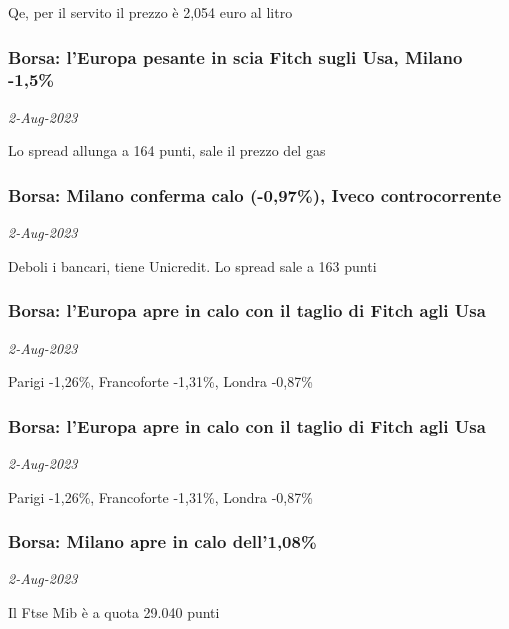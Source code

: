 Qe, per il servito il prezzo \`{e} 2,054 euro al litro
\subsubsection{Borsa: l'Europa pesante in scia Fitch sugli Usa, Milano -1,5\% \href{https://www.ansa.it/sito/notizie/economia/2023/08/02/borsa-leuropa-pesante-in-scia-fitch-sugli-usa-milano-15_9fe9a108-8de0-4823-96ac-fb78e4c922b4.html}{}}
\textit{2-Aug-2023}

Lo spread allunga a 164 punti, sale il prezzo del gas
\subsubsection{Borsa: Milano conferma calo (-0,97\%), Iveco controcorrente \href{https://www.ansa.it/sito/notizie/economia/2023/08/02/borsa-milano-conferma-calo-097-iveco-controcorrente_924f2910-ceec-4296-ad4e-11abd610cd34.html}{}}
\textit{2-Aug-2023}

Deboli i bancari, tiene Unicredit. Lo spread sale a 163 punti
\subsubsection{Borsa: l'Europa apre in calo con il taglio di Fitch agli Usa \href{https://www.ansa.it/sito/notizie/economia/2023/08/02/borsa-leuropa-apre-in-calo-con-il-taglio-di-fitch-agli-usa_28971275-2146-4716-abef-69b29f570a0f.html}{}}
\textit{2-Aug-2023}

Parigi -1,26\%, Francoforte -1,31\%, Londra -0,87\%
\subsubsection{Borsa: l'Europa apre in calo con il taglio di Fitch agli Usa \href{https://www.ansa.it/sito/notizie/economia/2023/08/02/borsa-leuropa-apre-in-calo-con-il-taglio-di-fitch-agli-usa_e843f8fc-4dda-42db-8593-9a2c92652673.html}{}}
\textit{2-Aug-2023}

Parigi -1,26\%, Francoforte -1,31\%, Londra -0,87\%
\subsubsection{Borsa: Milano apre in calo dell'1,08\% \href{https://www.ansa.it/sito/notizie/economia/2023/08/02/borsa-milano-apre-in-calo-dell108_dd01f5ea-8865-4abf-922e-91b321c0ba60.html}{}}
\textit{2-Aug-2023}

Il Ftse Mib \`{e} a quota 29.040 punti
